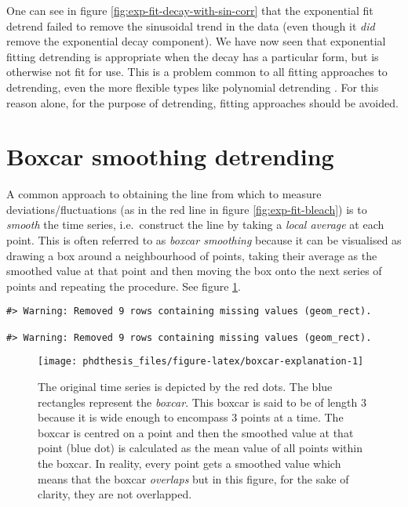 \documentclass[12pt,]{book}
\theoremstyle{definition}
\theoremstyle{definition}
\theoremstyle{definition}
\theoremstyle{remark}
\begin{document}
One can see in figure \ref{fig:exp-fit-decay-with-sin-corr} that the
exponential fit detrend failed to remove the sinusoidal trend in the
data (even though it \emph{did} remove the exponential decay component).
We have now seen that exponential fitting detrending is appropriate when
the decay has a particular form, but is otherwise not fit for use. This
is a problem common to all fitting approaches to detrending, even the
more flexible types like polynomial detrending \citep{polynomial}. For
this reason alone, for the purpose of detrending, fitting approaches
should be avoided.

\section{Boxcar smoothing detrending}\label{boxcar-smoothing-detrending}

A common approach to obtaining the line from which to measure
deviations/fluctuations (as in the red line in figure
\ref{fig:exp-fit-bleach}) is to \emph{smooth} the time series,
i.e.~construct the line by taking a \emph{local average} at each point.
This is often referred to as \emph{boxcar smoothing} because it can be
visualised as drawing a box around a neighbourhood of points, taking
their average as the smoothed value at that point and then moving the
box onto the next series of points and repeating the procedure. See
figure \ref{fig:boxcar-explanation}.










\begin{verbatim}
#> Warning: Removed 9 rows containing missing values (geom_rect).

#> Warning: Removed 9 rows containing missing values (geom_rect).
\end{verbatim}

\begin{figure}

\texttt{[image: phdthesis\_files/figure-latex/boxcar-explanation-1]} \hfill{}

\caption{The original time series is depicted by
the red dots. The blue rectangles represent the \emph{boxcar}. This
boxcar is said to be of length 3 because it is wide enough to encompass
3 points at a time. The boxcar is centred on a point and then the
smoothed value at that point (blue dot) is calculated as the mean value
of all points within the boxcar. In reality, every point gets a smoothed
value which means that the boxcar \emph{overlaps} but in this figure,
for the sake of clarity, they are not overlapped.}\label{fig:boxcar-explanation}
\end{figure}
\end{document}
